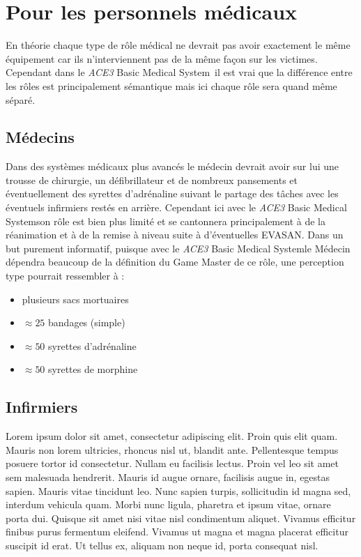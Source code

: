 \documentclass{article}
\newcommand{\medsys}{\emph{ACE3} Basic Medical System}
\begin{document}
		\section{Pour les personnels médicaux}
			En théorie chaque type de rôle médical ne devrait pas avoir exactement le même équipement car ils n'interviennent pas de la même façon sur les victimes. Cependant dans le \medsys\ il est vrai que la différence entre les rôles est principalement sémantique mais ici chaque rôle sera quand même séparé.
		
			\subsection{Médecins}
				Dans des systèmes médicaux plus avancés le médecin devrait avoir sur lui une trousse de chirurgie, un défibrillateur et de nombreux pansements et éventuellement des syrettes d'adrénaline suivant le partage des tâches avec les éventuels infirmiers restés en arrière. Cependant ici avec le \medsys son rôle est bien plus limité et se cantonnera principalement à de la réanimation et à de la remise à niveau suite à d'éventuelles EVASAN.
				Dans un but purement informatif, puisque avec le \medsys le Médecin dépendra beaucoup de la définition du Game Master de ce rôle, une perception type pourrait ressembler à :
				\begin{itemize}
					\item plusieurs sacs mortuaires
					\item $\approx25$ bandages (simple)
					\item $\approx50$ syrettes d'adrénaline
					\item $\approx50$ syrettes de morphine
				\end{itemize}
				
			\subsection{Infirmiers}
				Lorem ipsum dolor sit amet, consectetur adipiscing elit. Proin quis elit quam. Mauris non lorem ultricies, rhoncus nisl ut, blandit ante. Pellentesque tempus posuere tortor id consectetur. Nullam eu facilisis lectus. Proin vel leo sit amet sem malesuada hendrerit. Mauris id augue ornare, facilisis augue in, egestas sapien. Mauris vitae tincidunt leo. Nunc sapien turpis, sollicitudin id magna sed, interdum vehicula quam. Morbi nunc ligula, pharetra et ipsum vitae, ornare porta dui. Quisque sit amet nisi vitae nisl condimentum aliquet. Vivamus efficitur finibus purus fermentum eleifend. Vivamus ut magna et magna placerat efficitur suscipit id erat. Ut tellus ex, aliquam non neque id, porta consequat nisl.
			
\end{document}
